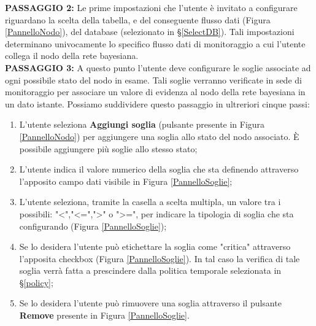 \pagebreak

\textbf{PASSAGGIO 2:} Le prime impostazioni che l'utente è invitato a configurare riguardano la scelta della tabella, e del conseguente flusso dati (Figura \ref{PannelloNodo}), del database (selezionato in §\ref{SelectDB}). Tali impostazioni determinano univocamente lo specifico flusso dati di monitoraggio a cui l'utente collega il nodo della rete bayesiana.
~\\

\textbf{PASSAGGIO 3:} A questo punto l'utente deve configurare le soglie associate ad ogni possibile stato del nodo in esame. Tali soglie verranno verificate in sede di monitoraggio per associare un valore di evidenza al nodo della rete bayesiana in un dato istante. Possiamo suddividere questo passaggio in ultreriori cinque passi:
\begin{enumerate}
	\item L'utente seleziona \textbf{Aggiungi soglia} (pulsante presente in Figura \ref{PannelloNodo}) per aggiungere una soglia allo stato del nodo associato. È possibile aggiungere più soglie allo stesso stato;
	\item L'utente indica il valore numerico della soglia che sta definendo attraverso l'apposito campo dati visibile in Figura \ref{PannelloSoglie};
	\item L'utente seleziona, tramite la casella a scelta multipla, un valore tra i possibili: "<","<=",">" o ">=", per indicare la tipologia di soglia che sta configurando (Figura \ref{PannelloSoglie});
	\item Se lo desidera l'utente può etichettare la soglia come "critica" attraverso l'apposita checkbox (Figura \ref{PannelloSoglie}). In tal caso la verifica di tale soglia verrà fatta a prescindere dalla politica temporale selezionata in §\ref{policy};
	\item Se lo desidera l'utente può rimuovere una soglia attraverso il pulsante \textbf{Remove} presente in Figura \ref{PannelloSoglie}.
\end{enumerate}

